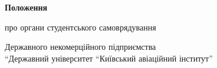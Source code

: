 \documentclass[12pt, a4paper]{article}
\begin{document}
\begin{titlepage}
    \centering
    \vspace*{\fill} %

    {\Huge\bfseries Положення}\par %
    \vspace{1em} %
    {\LARGE про органи студентського самоврядування}\par %
    \vspace{0.5em} %
    {\large Державного некомерційного підприємства \\ ``Державний університет ``Київський авіаційний інститут''}\par %

    \vspace*{\fill} %
\end{titlepage}















\end{document}
